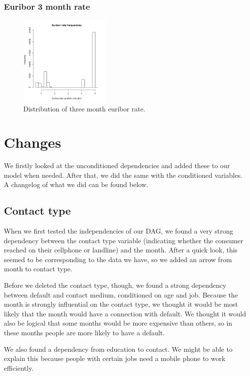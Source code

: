 \documentclass[11pt]{article}
\begin{document}
\begin{multicols}{2}
\subsubsection{Euribor 3 month rate}
\begin{figure}[H]
	\centering
	\includegraphics[width=0.4\textwidth]{images/euribor3m}
	\caption{Distribution of three month euribor rate.}
	\label{fig:euribor3m}
\end{figure}

\section{Changes}
We firstly looked at the unconditioned dependencies and added these to our
model when needed. After that, we did the same with the conditioned variables. A changelog
of what we did can be found below. 

\subsection{Contact type}
When we first tested the independencies of our DAG, we found a very strong
dependency between the contact type variable (indicating whether the consumer reached on their cellphone or landline) and the month. After a quick look, this
seemed to be corresponding to the data we have, so we added an arrow from month
to contact type. 

Before we deleted the contact type, though, we found a strong dependency between
default and contact medium, conditioned on age and job. Because the month is
strongly influential on the contact type, we thought it would be most likely
that the month would have a connection with default. We thought it would also be
logical that some months would be more expensive than others, so in these months
people are more likely to have a default. 

We also found a dependency from education to contact. We might be able to
explain this because people with certain jobs need a mobile phone to work
efficiently. 


\end{multicols}
\end{document}
